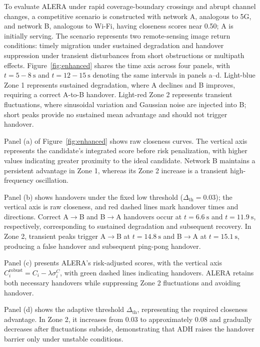 \documentclass[remotesensing,article,submit,moreauthors]{Definitions/mdpi}
\begin{document}
To evaluate ALERA under rapid coverage-boundary crossings and abrupt channel changes, a competitive scenario is constructed with network A, analogous to 5G, and network B, analogous to Wi-Fi, having closeness scores near 0.50; A is initially serving. The scenario represents two remote-sensing image return conditions: timely migration under sustained degradation and handover suppression under transient disturbances from short obstructions or multipath effects. Figure~\ref{fig:enhanced} shares the time axis across four panels, with $t=5-8~\mathrm{s}$ and $t=12-15~\mathrm{s}$ denoting the same intervals in panels a--d. Light-blue Zone 1 represents sustained degradation, where A declines and B improves, requiring a correct A-to-B handover. Light-red Zone 2 represents transient fluctuations, where sinusoidal variation and Gaussian noise are injected into B; short peaks provide no sustained mean advantage and should not trigger handover.

Panel (a) of Figure~\ref{fig:enhanced} shows raw closeness curves. The vertical axis represents the candidate's integrated score before risk penalization, with higher values indicating greater proximity to the ideal candidate. Network B maintains a persistent advantage in Zone 1, whereas its Zone 2 increase is a transient high-frequency oscillation.

Panel (b) shows handovers under the fixed low threshold ($\Delta_{\mathrm{th}}=0.03$); the vertical axis is raw closeness, and red dashed lines mark handover times and directions. Correct A$\rightarrow$B and B$\rightarrow$A handovers occur at $t=6.6~\mathrm{s}$ and $t=11.9~\mathrm{s}$, respectively, corresponding to sustained degradation and subsequent recovery. In Zone 2, transient peaks trigger A$\rightarrow$B at $t=14.8~\mathrm{s}$ and B$\rightarrow$A at $t=15.1~\mathrm{s}$, producing a false handover and subsequent ping-pong handover.

Panel (c) presents ALERA's risk-adjusted scores, with the vertical axis $C_i^{\mathrm{robust}}=C_i-\lambda\sigma_i^C$, with green dashed lines indicating handovers. ALERA retains both necessary handovers while suppressing Zone 2 fluctuations and avoiding handover.

Panel (d) shows the adaptive threshold $\Delta_{\mathrm{th}}$, representing the required closeness advantage. In Zone 2, it increases from 0.03 to approximately 0.08 and gradually decreases after fluctuations subside, demonstrating that ADH raises the handover barrier only under unstable conditions.
\end{document}
